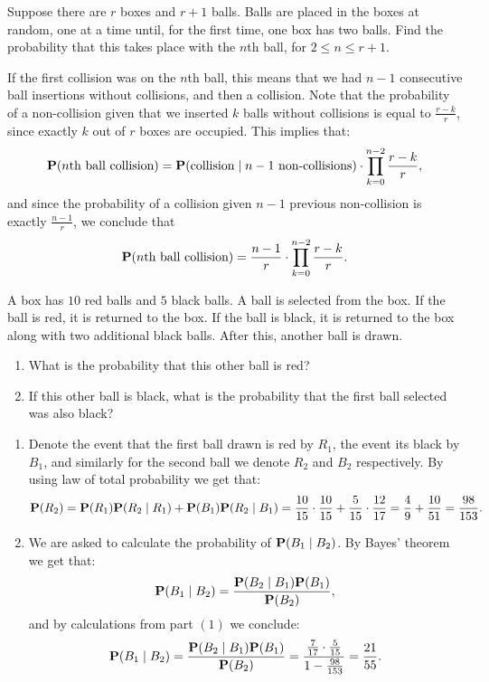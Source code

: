 \documentclass[11pt,a4paper]{article}
\begin{document}
\begin{exercise}
  Suppose there are $r$ boxes and $r + 1$ balls.
  Balls are placed in the boxes at random, one at a time until,
  for the first time, one box has two balls.
  Find the probability that this takes place with the $n$th ball,
  for $2 \le n \le r + 1$.
\end{exercise}
\begin{solution}
  If the first collision was on the $n$th ball,
  this means that we had $n-1$ consecutive ball insertions
  without collisions, and then a collision.
  Note that the probability of a non-collision
  given that we inserted $k$ balls without collisions is
  equal to $\frac{r - k}{r}$, since exactly $k$ out of $r$ boxes
  are occupied.
  This implies that:
  \[
    \mathbf{P}(n\text{th ball collision}) =
    \mathbf{P}(\text{collision} \mid n-1\text{ non-collisions}) \cdot
    \prod_{k=0}^{n-2} \frac{r - k}{r},
  \]
  and since the probability of a collision given $n-1$ previous
  non-collision is exactly $\frac{n-1}{r}$,
  we conclude that
  \[
    \mathbf{P}(n\text{th ball collision}) =
    \frac{n - 1}{r} \cdot
    \prod_{k=0}^{n-2} \frac{r - k}{r}.
  \]
\end{solution}

\begin{exercise}
  A box has $10$ red balls and $5$ black balls.
  A ball is selected from the box.
  If the ball is red, it is returned to the box.
  If the ball is black,
  it is returned to the box along with two additional black balls.
  After this, another ball is drawn.
  \begin{enumerate}
    \item[(1)] What is the probability that this other ball is red?
    \item[(2)] If this other ball is black, what is the probability that
      the first ball selected was also black?
  \end{enumerate}
\end{exercise}
\begin{solution}\phantom{}
  \begin{enumerate}
    \item[(1)] Denote the event that the first ball drawn is red
      by $R_1$, the event its black by $B_1$,
      and similarly for the second ball we denote $R_2$ and $B_2$
      respectively.
      By using law of total probability we get that:
      \[
        \mathbf{P}(R_2) =
        \mathbf{P}(R_1) \mathbf{P}(R_2 \mid R_1) + \mathbf{P}(B_1) \mathbf{P}(R_2 \mid B_1) =
        \frac{10}{15} \cdot \frac{10}{15} +
        \frac{5}{15} \cdot \frac{12}{17} =
        \frac{4}{9} + \frac{10}{51} =
        \frac{98}{153}.
      \]
    \item[(2)] We are asked to calculate the probability of $\mathbf{P}(B_1 \mid B_2)$.
      By Bayes' theorem we get that:
      \[
        \mathbf{P}(B_1 \mid B_2) =
        \frac{\mathbf{P}(B_2 \mid B_1) \mathbf{P}(B_1)}{\mathbf{P}(B_2)},
      \]
      and by calculations from part $(1)$ we conclude:
      \[
        \mathbf{P}(B_1 \mid B_2) =
        \frac{\mathbf{P}(B_2 \mid B_1) \mathbf{P}(B_1)}{\mathbf{P}(B_2)} =
        \frac{\frac{7}{17} \cdot \frac{5}{15}}{1 - \frac{98}{153}} =
        \frac{21}{55}.
      \]
  \end{enumerate}
\end{solution}
\end{document}
